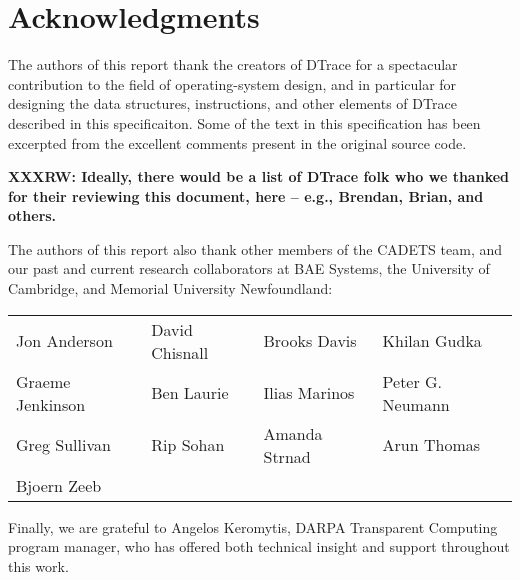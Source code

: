 \section*{Acknowledgments}
The authors of this report thank the creators of DTrace for a spectacular
contribution to the field of operating-system design, and in particular for
designing the data structures, instructions, and other elements of DTrace
described in this specificaiton.  Some of the text in this
specification has been excerpted from the excellent comments present
in the original source code.

\bigskip

\noindent
\textbf{XXXRW: Ideally, there would be a list of DTrace folk who we thanked
for their reviewing this document, here -- e.g., Brendan, Brian, and others.}

\bigskip

The authors of this report also thank other members of the CADETS team, and
our past and current research collaborators at BAE Systems, the University of
Cambridge, and Memorial University Newfoundland:

\bigskip

%
%
\begin{tabular}{llll}
Jon Anderson & David Chisnall & Brooks Davis & Khilan Gudka \\
Graeme Jenkinson & Ben Laurie & Ilias Marinos & Peter G. Neumann \\
Greg Sullivan & Rip Sohan & Amanda Strnad & Arun Thomas \\
Bjoern Zeeb
\end{tabular}

\bigskip

%
%
%

\noindent
Finally, we are grateful to Angelos Keromytis, DARPA Transparent Computing
program manager, who has offered both technical insight and support throughout
this work.
